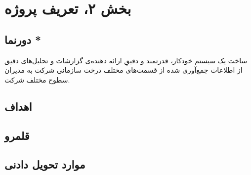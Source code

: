 \chapter{بخش ۲، تعریف پروژه\\}
\section{دورنما *}
ساخت یک سیستم خودکار، قدرتمند و دقیقِ ارائه دهنده‌ی گزارشات و تحلیل‌های دقیق از اطلاعات جمع‌آوری شده از قسمت‌های مختلف درخت سازمانی شرکت  به مدیران سطوح مختلف شرکت.

\section{اهداف }
\section{قلمرو }
\section{موارد تحویل دادنی }
